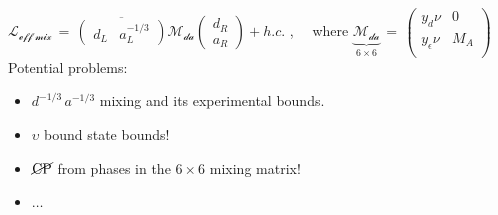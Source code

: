 \documentclass[10pt,letterpaper,oneside]{article}
\begin{document}
$\mathcal{L_{\text{eff mix}}}\,=\,
\overline{\left(\begin{matrix}
d_L & a_L^{-1/3}
\end{matrix}\right)} \mathcal{M_{\text{da}}} 
\left(\begin{matrix}
d_R \\
a_R
\end{matrix}\right) +h.c.$ , $\quad$where $\underbrace{\mathcal{M_{\text{da}}}}_{6\times 6}\, = \, 
\left(\begin{matrix}
y_d \nu & 0 \\
y_{\epsilon} \nu & M_A \\
\end{matrix}\right)$
\\
Potential problems: \begin{itemize}
\item $d^{-1/3}\, a^{-1/3}$ mixing and its experimental bounds. \\
\item $\upsilon$ bound state bounds! \\
\item $\cancel{\text{CP}}$ from phases in the $6\times 6$ mixing matrix! \\
\item $\dots$
\end{itemize}
\end{document}
